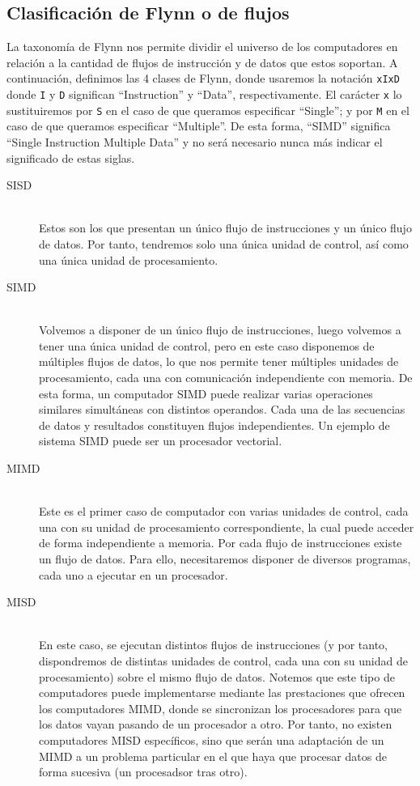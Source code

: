 \subsection{Clasificación de Flynn o de flujos}
La taxonomía de Flynn nos permite dividir el universo de los computadores en relación a la cantidad de flujos de instrucción y de datos que estos soportan. A continuación, definimos las 4 clases de Flynn, donde usaremos la notación \verb|xIxD| donde \verb|I| y \verb|D| significan ``Instruction'' y ``Data'', respectivamente. El carácter \verb|x| lo sustituiremos por \verb|S| en el caso de que queramos especificar ``Single''; y por \verb|M| en el caso de que queramos especificar ``Multiple''. De esta forma, ``SIMD'' significa ``Single Instruction Multiple Data'' y no será necesario nunca más indicar el significado de estas siglas.
\begin{description}
    \item [SISD]~\\
        Estos son los que presentan un único flujo de instrucciones y un único flujo de datos. Por tanto, tendremos solo una única unidad de control, así como una única unidad de procesamiento. 
    \item [SIMD]~\\
        Volvemos a disponer de un único flujo de instrucciones, luego volvemos a tener una única unidad de control, pero en este caso disponemos de múltiples flujos de datos, lo que nos permite tener múltiples unidades de procesamiento, cada una con comunicación independiente con memoria. De esta forma, un computador SIMD puede realizar varias operaciones similares simultáneas con distintos operandos. Cada una de las secuencias de datos y resultados constituyen flujos independientes. Un ejemplo de sistema SIMD puede ser un procesador vectorial.
    \item [MIMD]~\\
        Este es el primer caso de computador con varias unidades de control, cada una con su unidad de procesamiento correspondiente, la cual puede acceder de forma independiente a memoria. Por cada flujo de instrucciones existe un flujo de datos. Para ello, necesitaremos disponer de diversos programas, cada uno a ejecutar en un procesador.
    \item [MISD]~\\
        En este caso, se ejecutan distintos flujos de instrucciones (y por tanto, dispondremos de distintas unidades de control, cada una con su unidad de procesamiento) sobre el mismo flujo de datos. Notemos que este tipo de computadores puede implementarse mediante las prestaciones que ofrecen los computadores MIMD, donde se sincronizan los procesadores para que los datos vayan pasando de un procesador a otro. Por tanto, no existen computadores MISD específicos, sino que serán una adaptación de un MIMD a un problema particular en el que haya que procesar datos de forma sucesiva (un procesadsor tras otro).
\end{description}

